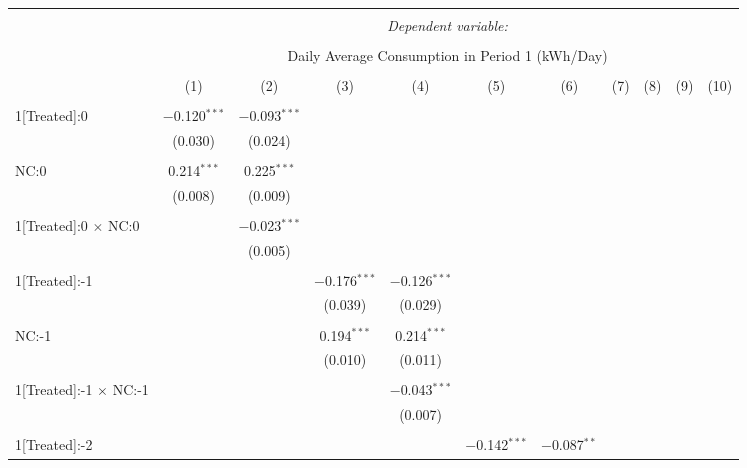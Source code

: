
\begin{table}[!htbp] \centering 
  \caption{} 
  \label{} 
\tiny 
\begin{tabular}{@{\extracolsep{5pt}}lcccccccccc} 
\\[-1.8ex]\hline 
\hline \\[-1.8ex] 
 & \multicolumn{10}{c}{\textit{Dependent variable:}} \\ 
\cline{2-11} 
\\[-1.8ex] & \multicolumn{10}{c}{Daily Average Consumption in Period 1 (kWh/Day)} \\ 
\\[-1.8ex] & (1) & (2) & (3) & (4) & (5) & (6) & (7) & (8) & (9) & (10)\\ 
\hline \\[-1.8ex] 
 1[Treated]:0 & $-$0.120$^{***}$ & $-$0.093$^{***}$ &  &  &  &  &  &  &  &  \\ 
  & (0.030) & (0.024) &  &  &  &  &  &  &  &  \\ 
  & & & & & & & & & & \\ 
 NC:0 & 0.214$^{***}$ & 0.225$^{***}$ &  &  &  &  &  &  &  &  \\ 
  & (0.008) & (0.009) &  &  &  &  &  &  &  &  \\ 
  & & & & & & & & & & \\ 
 1[Treated]:0 $\times$ NC:0 &  & $-$0.023$^{***}$ &  &  &  &  &  &  &  &  \\ 
  &  & (0.005) &  &  &  &  &  &  &  &  \\ 
  & & & & & & & & & & \\ 
 1[Treated]:-1 &  &  & $-$0.176$^{***}$ & $-$0.126$^{***}$ &  &  &  &  &  &  \\ 
  &  &  & (0.039) & (0.029) &  &  &  &  &  &  \\ 
  & & & & & & & & & & \\ 
 NC:-1 &  &  & 0.194$^{***}$ & 0.214$^{***}$ &  &  &  &  &  &  \\ 
  &  &  & (0.010) & (0.011) &  &  &  &  &  &  \\ 
  & & & & & & & & & & \\ 
 1[Treated]:-1 $\times$ NC:-1 &  &  &  & $-$0.043$^{***}$ &  &  &  &  &  &  \\ 
  &  &  &  & (0.007) &  &  &  &  &  &  \\ 
  & & & & & & & & & & \\ 
 1[Treated]:-2 &  &  &  &  & $-$0.142$^{***}$ & $-$0.087$^{**}$ &  &  &  &  \\ 

\end{tabular}
\end{table}
